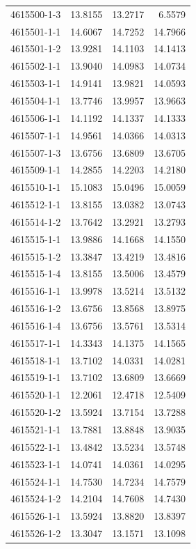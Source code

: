 \begin{longtable}{lrrr}
4615500-1-3 & 13.8155 & 13.2717 & 6.5579 \\
4615501-1-1 & 14.6067 & 14.7252 & 14.7966 \\
4615501-1-2 & 13.9281 & 14.1103 & 14.1413 \\
4615502-1-1 & 13.9040 & 14.0983 & 14.0734 \\
4615503-1-1 & 14.9141 & 13.9821 & 14.0593 \\
4615504-1-1 & 13.7746 & 13.9957 & 13.9663 \\
4615506-1-1 & 14.1192 & 14.1337 & 14.1333 \\
4615507-1-1 & 14.9561 & 14.0366 & 14.0313 \\
4615507-1-3 & 13.6756 & 13.6809 & 13.6705 \\
4615509-1-1 & 14.2855 & 14.2203 & 14.2180 \\
4615510-1-1 & 15.1083 & 15.0496 & 15.0059 \\
4615512-1-1 & 13.8155 & 13.0382 & 13.0743 \\
4615514-1-2 & 13.7642 & 13.2921 & 13.2793 \\
4615515-1-1 & 13.9886 & 14.1668 & 14.1550 \\
4615515-1-2 & 13.3847 & 13.4219 & 13.4816 \\
4615515-1-4 & 13.8155 & 13.5006 & 13.4579 \\
4615516-1-1 & 13.9978 & 13.5214 & 13.5132 \\
4615516-1-2 & 13.6756 & 13.8568 & 13.8975 \\
4615516-1-4 & 13.6756 & 13.5761 & 13.5314 \\
4615517-1-1 & 14.3343 & 14.1375 & 14.1565 \\
4615518-1-1 & 13.7102 & 14.0331 & 14.0281 \\
4615519-1-1 & 13.7102 & 13.6809 & 13.6669 \\
4615520-1-1 & 12.2061 & 12.4718 & 12.5409 \\
4615520-1-2 & 13.5924 & 13.7154 & 13.7288 \\
4615521-1-1 & 13.7881 & 13.8848 & 13.9035 \\
4615522-1-1 & 13.4842 & 13.5234 & 13.5748 \\
4615523-1-1 & 14.0741 & 14.0361 & 14.0295 \\
4615524-1-1 & 14.7530 & 14.7234 & 14.7579 \\
4615524-1-2 & 14.2104 & 14.7608 & 14.7430 \\
4615526-1-1 & 13.5924 & 13.8820 & 13.8397 \\
4615526-1-2 & 13.3047 & 13.1571 & 13.1098 \\

\end{longtable}
